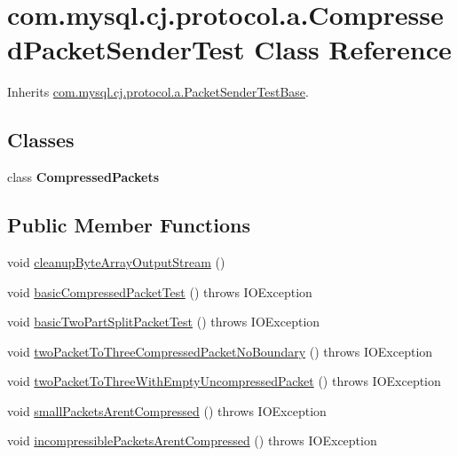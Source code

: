 \hypertarget{classcom_1_1mysql_1_1cj_1_1protocol_1_1a_1_1_compressed_packet_sender_test}{}\section{com.\+mysql.\+cj.\+protocol.\+a.\+Compressed\+Packet\+Sender\+Test Class Reference}
\label{classcom_1_1mysql_1_1cj_1_1protocol_1_1a_1_1_compressed_packet_sender_test}


Inherits \mbox{\hyperlink{classcom_1_1mysql_1_1cj_1_1protocol_1_1a_1_1_packet_sender_test_base}{com.\+mysql.\+cj.\+protocol.\+a.\+Packet\+Sender\+Test\+Base}}.

\subsection*{Classes}
\begin{DoxyCompactItemize}
\item 
class {\bfseries Compressed\+Packets}
\end{DoxyCompactItemize}
\subsection*{Public Member Functions}
\begin{DoxyCompactItemize}
\item 
void \mbox{\hyperlink{classcom_1_1mysql_1_1cj_1_1protocol_1_1a_1_1_compressed_packet_sender_test_af67925d0344ff8a12c1525e4cb48c6fd}{cleanup\+Byte\+Array\+Output\+Stream}} ()
\item 
void \mbox{\hyperlink{classcom_1_1mysql_1_1cj_1_1protocol_1_1a_1_1_compressed_packet_sender_test_a5a69b6b2b370e80ed8f9f6b65ad48495}{basic\+Compressed\+Packet\+Test}} ()  throws I\+O\+Exception 
\item 
void \mbox{\hyperlink{classcom_1_1mysql_1_1cj_1_1protocol_1_1a_1_1_compressed_packet_sender_test_ad6a6a86c8224457f8e9c2b95d51fd82a}{basic\+Two\+Part\+Split\+Packet\+Test}} ()  throws I\+O\+Exception 
\item 
void \mbox{\hyperlink{classcom_1_1mysql_1_1cj_1_1protocol_1_1a_1_1_compressed_packet_sender_test_a594ae002b7ba9c36c05f0b069a3bbbf4}{two\+Packet\+To\+Three\+Compressed\+Packet\+No\+Boundary}} ()  throws I\+O\+Exception 
\item 
void \mbox{\hyperlink{classcom_1_1mysql_1_1cj_1_1protocol_1_1a_1_1_compressed_packet_sender_test_ac8e6517377ed11a4566c755ffc1b65de}{two\+Packet\+To\+Three\+With\+Empty\+Uncompressed\+Packet}} ()  throws I\+O\+Exception 
\item 
void \mbox{\hyperlink{classcom_1_1mysql_1_1cj_1_1protocol_1_1a_1_1_compressed_packet_sender_test_ac65b76458caed5ab06d065e8ecdd9b50}{small\+Packets\+Arent\+Compressed}} ()  throws I\+O\+Exception 
\item 
void \mbox{\hyperlink{classcom_1_1mysql_1_1cj_1_1protocol_1_1a_1_1_compressed_packet_sender_test_a9eddb109f99242eaf11530fecfbbe52d}{incompressible\+Packets\+Arent\+Compressed}} ()  throws I\+O\+Exception 
\end{DoxyCompactItemize}
